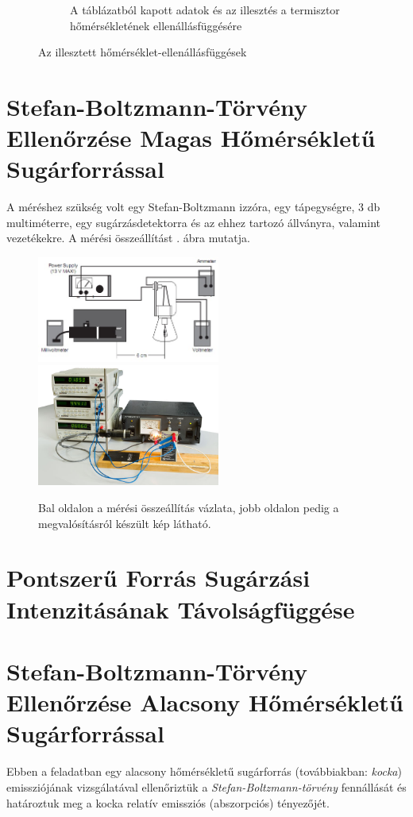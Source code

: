 \documentclass[a4paper, 12pt]{article}
\begin{document}
\begin{figure}[H]
\begin{subfigure}[b]{0.49\textwidth}
            \caption{A táblázatból kapott adatok és az illesztés a termisztor hőmérsékletének ellenállásfüggésére}
            \label{fig:1term}
        \end{subfigure}
        \caption{Az illesztett hőmérséklet-ellenállásfüggések}
        \label{fig:1ill}
    \end{figure}

    \section[Magas Hőmérsékletű Sugárforrás]{Stefan-Boltzmann-Törvény Ellenőrzése Magas Hőmérsékletű Sugárforrással}
    A méréshez szükség volt egy Stefan-Boltzmann izzóra, egy tápegységre, 3 db multiméterre, egy sugárzásdetektorra és az ehhez tartozó állványra, valamint vezetékekre.
    A mérési összeállítást . ábra mutatja.
    \begin{figure}
        \label{fig:2fel}
        \centering
        \includegraphics[width=6cm]{Mérési_elrendezés_1_homsug}
        \includegraphics[width=6cm]{Homsug8.jpg}
        \caption{Bal oldalon a mérési összeállítás vázlata, jobb oldalon pedig a megvalósításról készült kép látható.}
    \end{figure}
    \section[Intenzitás Távolságfüggése]{Pontszerű Forrás Sugárzási Intenzitásának Távolságfüggése}
    
    \section[Alacsony Hőmérsékletű Sugárforrás]{Stefan-Boltzmann-Törvény Ellenőrzése Alacsony Hőmérsékletű Sugárforrással}
    Ebben a feladatban egy alacsony hőmérsékletű sugárforrás (továbbiakban: \textit{kocka}) emissziójának vizsgálatával ellenőriztük a \textit{Stefan-Boltzmann-törvény} fennállását és határoztuk meg a kocka relatív emissziós (abszorpciós) tényezőjét.
\end{document}
